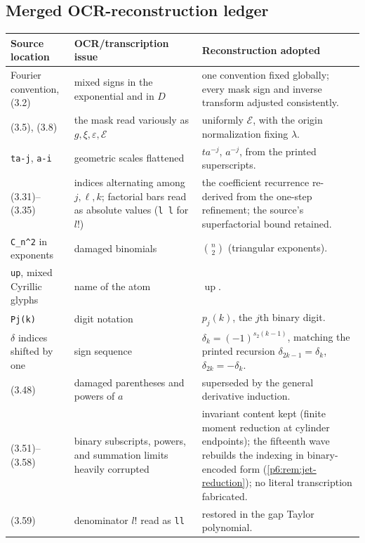 \documentclass[11pt,oneside]{article}
\numberwithin{equation}{section}
\theoremstyle{definition}
\theoremstyle{remark}
\newcommand{\Up}{\operatorname{up}}
\newcommand{\wt}{s_2}
\begin{document}
\subsection*{Merged OCR-reconstruction ledger}

\begin{longtable}{@{}p{}p{}p{}@{}}
\toprule
Source location & OCR/transcription issue & Reconstruction adopted \\
\midrule
\endhead
Fourier convention, (3.2) & mixed signs in the exponential and in $D$ &
one convention fixed globally; every mask sign and inverse transform
adjusted consistently.\\
(3.5), (3.8) & the mask read variously as $g,\xi,\varepsilon,\mathcal E$ &
uniformly $\mathcal E$, with the origin normalization fixing $\lambda$.\\
\texttt{ta-j}, \texttt{a-i} & geometric scales flattened & $ta^{-j}$,
$a^{-j}$, from the printed superscripts.\\
(3.31)--(3.35) & indices alternating among $j,\ell,k$; factorial bars read
as absolute values (\texttt{l l} for $l!$) & the coefficient recurrence
re-derived from the one-step refinement; the source's superfactorial bound
retained.\\
\texttt{C\_n\textasciicircum2} in exponents & damaged binomials &
$\binom n2$ (triangular exponents).\\
\texttt{up}, mixed Cyrillic glyphs & name of the atom & $\Up$.\\
\texttt{Pj(k)} & digit notation & $p_j(k)$, the $j$th binary digit.\\
$\delta$ indices shifted by one & sign sequence &
$\delta_k=(-1)^{\wt(k-1)}$, matching the printed recursion
$\delta_{2k-1}=\delta_k$, $\delta_{2k}=-\delta_k$.\\
(3.48) & damaged parentheses and powers of $a$ & superseded by the general
derivative induction.\\
(3.51)--(3.58) & binary subscripts, powers, and summation limits heavily
corrupted & invariant content kept (finite moment reduction at cylinder
endpoints); the fifteenth wave rebuilds the indexing in binary-encoded
form (\cref{p6:rem:jet-reduction}); no literal transcription fabricated.\\
(3.59) & denominator $l!$ read as \texttt{ll} & restored in the gap Taylor
polynomial.\\

\end{longtable}
\end{document}
